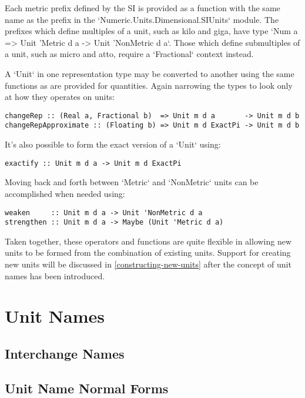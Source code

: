 \documentclass[11pt]{report}
\begin{document}
Each metric prefix defined by the SI is provided as a function with the same name as the prefix in the `Numeric.Units.Dimensional.SIUnits` module.
The prefixes which define multiples of a unit, such as kilo and giga, have type `Num a => Unit 'Metric d a -> Unit 'NonMetric d a`.
Those which define submultiples of a unit, such as micro and atto, require a `Fractional` context instead.

A `Unit` in one representation type may be converted to another using the same functions as are provided for quantities.
Again narrowing the types to look only at how they operates on units:

\begin{lstlisting}
changeRep :: (Real a, Fractional b)  => Unit m d a       -> Unit m d b
changeRepApproximate :: (Floating b) => Unit m d ExactPi -> Unit m d b
\end{lstlisting}

It's also possible to form the exact version of a `Unit` using:

\begin{lstlisting}
exactify :: Unit m d a -> Unit m d ExactPi
\end{lstlisting}

Moving back and forth between `Metric` and `NonMetric` units can be accomplished when needed using:

\begin{lstlisting}
weaken     :: Unit m d a -> Unit 'NonMetric d a
strengthen :: Unit m d a -> Maybe (Unit 'Metric d a)
\end{lstlisting}

Taken together, these operators and functions are quite flexible in allowing new units to be formed from
the combination of existing units. Support for creating new units will be discussed in \ref{constructing-new-units} after
the concept of unit names has been introduced.

\section{Unit Names}

\subsection{Interchange Names}
\subsection{Unit Name Normal Forms}
\end{document}
